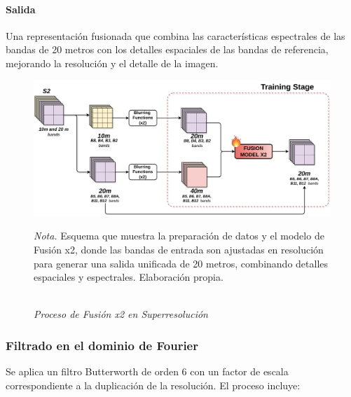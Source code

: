             \paragraph{Salida}

                Una representación fusionada que combina las características espectrales de las bandas de 20 metros con los detalles espaciales de las bandas de referencia, mejorando la resolución y el detalle de la imagen.
        
            \begin{figure}[H] 
                \caption{\doublespacing \\ \textit{Proceso de Fusión x2 en Superresolución}} 
                \centering
                \includegraphics[width=1\linewidth]{images/fusionx2_training.png}
                \begin{justify}
                    \textit{Nota.} Esquema que muestra la preparación de datos y el modelo de Fusión x2, donde las bandas de entrada son ajustadas en resolución para generar una salida unificada de 20 metros, combinando detalles espaciales y espectrales. Elaboración propia.
                \end{justify}                    
                \label{fig:fusionx2_training}
            \end{figure}

        \subsubsection{Filtrado en el dominio de Fourier}

            Se aplica un filtro Butterworth de orden 6 con un factor de escala correspondiente a la duplicación de la resolución. El proceso incluye:

